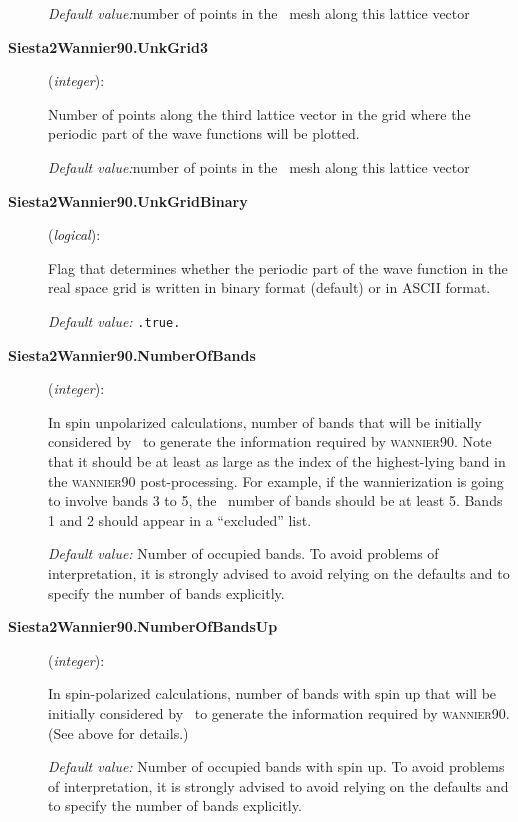 \begin{description}
\textit{Default value:}{number of points in the \siesta\ mesh along this lattice vector}

\item[\textbf{Siesta2Wannier90.UnkGrid3}] (\textit{integer}):

Number of points along the third lattice vector in the grid where
the periodic part of the wave functions will be plotted.

\textit{Default value:}{number of points in the \siesta\ mesh along this lattice vector}

\item[\textbf{Siesta2Wannier90.UnkGridBinary}] (\textit{logical}):

Flag that determines whether the periodic part of the wave function in the
real space grid is written in binary format (default) or in ASCII format.

\textit{Default value:} \texttt{.true.}

\item[\textbf{Siesta2Wannier90.NumberOfBands}] (\textit{integer}):

In spin unpolarized calculations, number of bands that will be
initially considered by \siesta\ to generate the information
required by \textsc{wannier90}. Note that it should be at least as large as the
index of the highest-lying band in the \textsc{wannier90} post-processing. For
example, if the wannierization is going to involve bands 3 to 5, the
\siesta\ number of bands should be at least 5. Bands 1 and 2
should appear in a ``excluded'' list.

\textit{Default value:} {Number of occupied bands. To avoid problems
  of interpretation, it is strongly advised to avoid relying on the
  defaults and to specify the number of bands explicitly.}


\item[\textbf{Siesta2Wannier90.NumberOfBandsUp}] (\textit{integer}):

In spin-polarized calculations, number of bands with spin up that will be
initially considered by \siesta\ to generate the information
required by \textsc{wannier90}. (See above for details.)

\textit{Default value:} {Number of occupied bands with spin up. To
  avoid problems of interpretation, it is strongly advised to avoid
  relying on the defaults and to specify the number of bands
  explicitly. }


\end{description}
